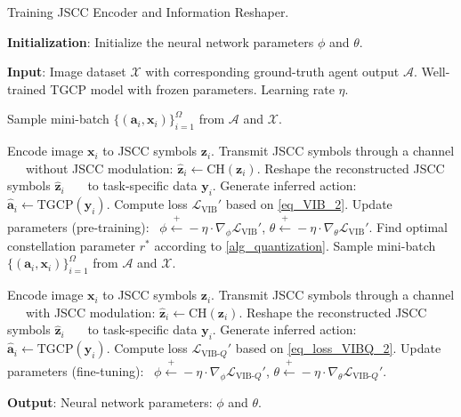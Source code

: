 \begin{algorithm}[t]
\caption{Training JSCC Encoder and Information Reshaper.}
\label{alg_training}
\begin{algorithmic}[1]

\Statex \textbf{Initialization}: Initialize the neural network parameters \(\phi\) and \(\theta\).

\State \textbf{Input}: Image dataset $\mathcal{X}$ with corresponding ground-truth agent output $\mathcal{A}$. Well-trained TGCP model with frozen parameters. Learning rate \(\eta\).

    \State Sample mini-batch $\{(\bm{a}_i, \bm{x}_i)\}_{i=1}^{\Omega}$ from $\mathcal{A}$ and $\mathcal{X}$.
    
        \State Encode image \(\bm{x}_{i}\) to JSCC symbols \(\bm{z}_{i}\).
        \State Transmit JSCC symbols through a channel  
        \Statex \qquad \ \ \ without JSCC modulation: \(\hat{\bm{z}}_i\leftarrow\text{CH}(\bm{z}_i)\).
        \State Reshape the reconstructed JSCC symbols \(\hat{\bm{z}}_i\)
        \Statex \qquad \ \ \ to task-specific data \(\bm{y}_i\).
        \State Generate inferred action: \(\hat{\bm{a}}_i\leftarrow\text{TGCP}(\bm{y}_i)\).
        \State Compute loss \(\mathcal{L}_{\text{VIB}}'\) based on \cref{eq_VIB_2}.
    \EndFor
    \State Update parameters (pre-training):
    \Statex \quad \, \(\phi \overset{+}\leftarrow -\eta\cdot\nabla_{\phi}\mathcal{L}_\text{VIB}' \), \(\theta \overset{+}\leftarrow -\eta\cdot\nabla_{\theta}\mathcal{L}_\text{VIB}' \).
\EndWhile
\State Find optimal constellation parameter \(r^{*}\) according to \cref{alg_quantization}.
    \State Sample mini-batch $\{(\bm{a}_i, \bm{x}_i)\}_{i=1}^{\Omega}$ from $\mathcal{A}$ and $\mathcal{X}$.
    
        \State Encode image \(\bm{x}_{i}\) to JSCC symbols \(\bm{z}_{i}\).
        \State Transmit JSCC symbols through a channel  
        \Statex \qquad \ \ \ with JSCC modulation: \(\hat{\bm{z}}_i\leftarrow\text{CH}(\bm{z}_i)\).
        \State Reshape the reconstructed JSCC symbols \(\hat{\bm{z}}_i\)
        \Statex \qquad \ \ \ to task-specific data \(\bm{y}_i\).
        \State Generate inferred action: \(\hat{\bm{a}}_i\leftarrow\text{TGCP}(\bm{y}_i)\).
        \State Compute loss \(\mathcal{L}_{\text{VIB-}Q}'\) based on \cref{eq_loss_VIBQ_2}.
    \EndFor
    \State Update parameters (fine-tuning):
    \Statex \quad \, \(\phi \overset{+}\leftarrow -\eta\cdot\nabla_{\phi}\mathcal{L}_{\text{VIB-}Q} '\), \(\theta \overset{+}\leftarrow -\eta\cdot\nabla_{\theta}\mathcal{L}_{\text{VIB-}Q} '\). 

\EndWhile

\State \textbf{Output}: Neural network parameters: \(\phi\) and \(\theta\).


\end{algorithmic}
\end{algorithm}